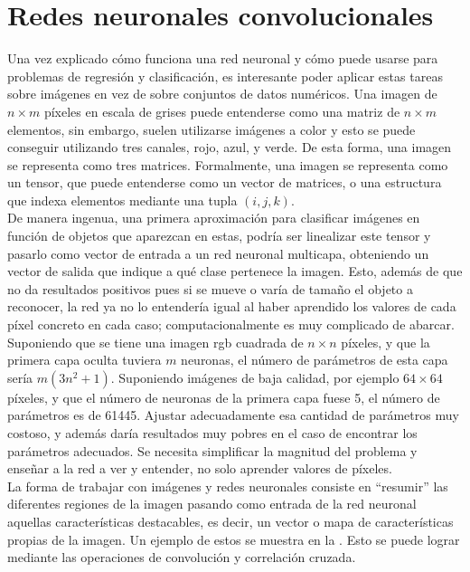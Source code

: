 \begin{itemize}
			\end{itemize}
			
		\section{Redes neuronales convolucionales}
		
			Una vez explicado cómo funciona una red neuronal y cómo puede usarse para problemas de regresión y clasificación, es interesante poder aplicar estas tareas sobre imágenes en vez de sobre conjuntos de datos numéricos. Una imagen de $n \times m$ píxeles en escala de grises puede entenderse como una matriz de $n \times m$ elementos, sin embargo, suelen utilizarse imágenes a color y esto se puede conseguir utilizando tres canales, rojo, azul, y verde. De esta forma, una imagen se representa como tres matrices. Formalmente, una imagen se representa como un tensor, que puede entenderse como un vector de matrices, o una estructura que indexa elementos mediante una tupla $(i, j, k)$.\\
			
			De manera ingenua, una primera aproximación para clasificar imágenes en función de objetos que aparezcan en estas, podría ser linealizar este tensor y pasarlo como vector de entrada a un red neuronal multicapa, obteniendo un vector de salida que indique a qué clase pertenece la imagen. Esto, además de que no da resultados positivos pues si se mueve o varía de tamaño el objeto a reconocer, la red ya no lo entendería igual al haber aprendido los valores de cada píxel concreto en cada caso; computacionalmente es muy complicado de abarcar. Suponiendo que se tiene una imagen \gls{rgb} cuadrada de $n \times n$ píxeles, y que la primera capa oculta tuviera $m$ neuronas, el número de parámetros de esta capa sería $m(3n^2 + 1)$. Suponiendo imágenes de baja calidad, por ejemplo $64 \times 64$ píxeles, y que el número de neuronas de la primera capa fuese 5, el número de parámetros es de 61445. Ajustar adecuadamente esa cantidad de parámetros muy costoso, y además daría resultados muy pobres en el caso de encontrar los parámetros adecuados. Se necesita simplificar la magnitud del problema y enseñar a la red a ver y entender, no solo aprender valores de píxeles. \\
			
			La forma de trabajar con imágenes y redes neuronales consiste en ``resumir'' las diferentes regiones de la imagen pasando como entrada de la red neuronal aquellas características destacables, es decir, un vector o mapa de características propias de la imagen. Un ejemplo de estos se muestra en la . Esto se puede lograr mediante las operaciones de convolución y correlación cruzada. 
			
